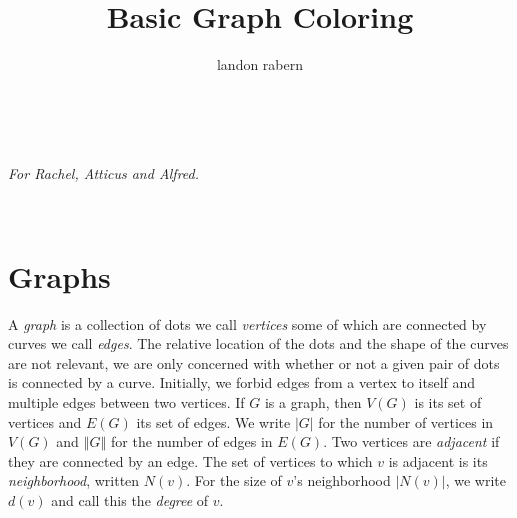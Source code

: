 \documentclass{tufte-book} %
\title{Basic Graph Coloring}
\author{landon rabern}
\theoremstyle{plain}
\newcommand{\card}[1]{\left|#1\right|}
\newcommand{\size}[1]{\left\Vert#1\right\Vert}
\begin{document}
\frontmatter
\maketitle 


\tableofcontents


\cleardoublepage
~\vfill
\begin{doublespace}
\noindent\fontsize{18}{22}\selectfont\itshape
\nohyphenation
For Rachel, Atticus and Alfred.
\end{doublespace}
\vfill
\vfill

\cleardoublepage
\mainmatter
\chapter{Graphs}
A \emph{graph} is a collection of dots we call \emph{vertices} some of which are connected by curves we call \emph{edges}. 
The relative location of the dots and the shape of the curves are not relevant, we are only concerned with whether or not a given
pair of dots is connected by a curve.  Initially, we forbid edges from a vertex to itself and multiple edges between two vertices.
If $G$ is a graph, then $V(G)$ is its set of vertices and $E(G)$ its set of edges. 
We write $\card{G}$ for the number of vertices in $V(G)$ and $\size{G}$ for the number of edges in $E(G)$. \marginnote{$\card{G}$, $\size{G}$}
Two vertices
are \emph{adjacent}  if they are connected by an edge.  The set
of vertices to which $v$ is adjacent is its \emph{neighborhood}, written $N(v)$.  
For the size of $v$'s neighborhood $\card{N(v)}$, we write $d(v)$ and call this the \emph{degree} of $v$. 
\end{document}
